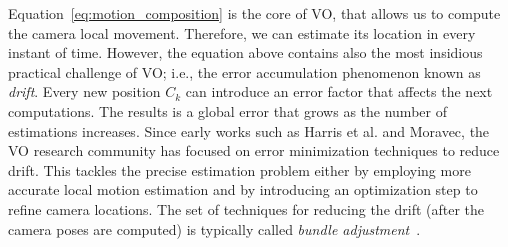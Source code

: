 Equation~\ref{eq:motion_composition} is the core of VO, that allows us to compute the camera local movement. Therefore, we can estimate its location in every instant of time. However, the equation above contains also the most insidious practical challenge of VO; i.e., the error accumulation phenomenon known as \emph{drift}.
Every new position $C_k$ can introduce an error factor that affects the next 
computations. The results is a global error that grows as the number of 
estimations increases.
%
Since early works such as Harris et al.\cite{harris19883d} and Moravec\cite{moravec1980obstacle}, the VO research community has focused on error minimization techniques to reduce drift.
This tackles the precise estimation problem either by employing more accurate
local motion estimation and by introducing an optimization step to refine 
camera locations.
The set of techniques for reducing the drift (after the camera poses are computed) is typically called \emph{bundle adjustment}~\cite{triggs1999bundle}.

